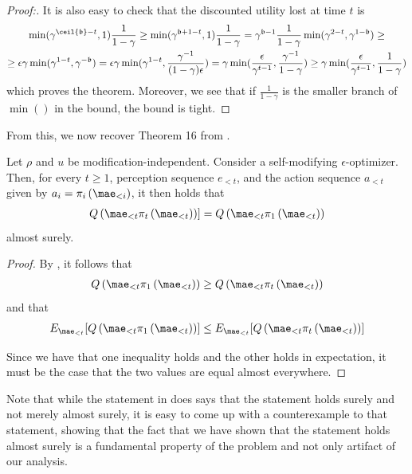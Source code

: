 \begin{proof}[Proof:]
It is also easy to check that the discounted utility lost at time $t$ is
\begin{gather}
\min(\gamma^{\ceil{\mathfrak{b}}-t},1)\frac{1}{1-\gamma} \geq \min(\gamma^{\mathfrak{b}+1-t},1)\frac{1}{1-\gamma} = \gamma^{\mathfrak{b}-1} \frac{1}{1-\gamma} \min(\gamma^{2-t},\gamma^{1-\mathfrak{b}}) \geq \\
\geq \epsilon \gamma \min(\gamma^{1-t},\gamma^{-\mathfrak{b}}) = \epsilon \gamma \min(\gamma^{1-t},\frac{\gamma^{-1}}{(1-\gamma)\epsilon}) = \gamma \min(\frac{\epsilon}{\gamma^{t-1}}, \frac{\gamma^{-1}}{1-\gamma}) \geq \gamma \min(\frac{\epsilon}{\gamma^{t-1}}, \frac{1}{1-\gamma})
\end{gather}
which proves the theorem. Moreover, we see that if $\frac{1}{1-\gamma}$ is the smaller branch of $\min()$ in the bound, the bound is tight.
\end{proof}

From this, we now recover Theorem 16 from \cite{everitt}.

\begin{corollary} \label{cor:recover_everitt}
Let $\rho$ and $u$ be modification-independent. Consider a self-modifying $\epsilon$-optimizer. Then, for every $t \geq 1$, perception sequence $e_{<t}$, and the action sequence $a_{<t}$ given by $a_{i}=\pi_{i}\left(\mae_{<i}\right)$, it then holds that
\begin{gather}
Q\left(\mae_{<t} \pi_{t}\left(\mae_{<t}\right)\right)] = Q\left(\mae_{<t} \pi_{1}\left(\mae_{<t}\right)\right)
\end{gather}
almost surely.
\end{corollary}
\begin{proof}
By , it follows that 
\begin{gather}
Q\left(\mae_{<t} \pi_{1}\left(\mae_{<t}\right)\right) \geq Q\left(\mae_{<t} \pi_{t}\left(\mae_{<t}\right)\right)
\end{gather}
and that 
\begin{gather}
E_{\mae_{<t}}[Q\left(\mae_{<t} \pi_{1}\left(\mae_{<t}\right)\right)] \leq E_{\mae_{<t}} [Q\left(\mae_{<t} \pi_{t}\left(\mae_{<t}\right)\right)] 
\end{gather}

Since we have that one inequality holds and the other holds in expectation, it must be the case that the two values are equal almost everywhere.
\end{proof}

Note that while the statement in \cite{everitt} does says that the statement holds surely and not merely almost surely, it is easy to come up with a counterexample to that statement, showing that the fact that we have shown that the statement holds almost surely is a fundamental property of the problem and not only artifact of our analysis.
